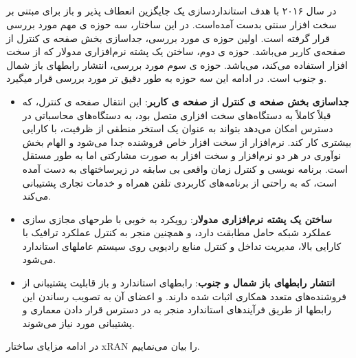 \subsection{}
در سال ۲۰۱۶ با هدف استانداردسازی یک جایگزین انعطاف پذیر و باز برای 
مبتنی بر سخت افزار سنتی بدست آمده‌است.
 در این ساختار، سه حوزه ی مهم مورد بررسی قرار گرفته است.
اولین حوزه ی مورد بررسی، جداسازی بخش
صفحه ی کنترل
  از 
 صفحه‌ی کاربر
می‌باشد. حوزه ی دوم،
ساختن یک پشته نرم‌افزاری  مدولار که از سخت افزار  استفاده می‌کند، می‌باشد.
حوزه ی سوم مورد بررسی، انتشار رابطهای باز شمال و جنوب است\cite{xran}.
در ادامه این سه حوزه به طور دقیق تر مورد بررسی قرار میگیرد\cite{xran1}.

\begin{itemize}
\item \textbf{ جداسازی بخش صفحه ی کنترل از 
صفحه ی کاربر}:
این انتقال صفحه ی کنترل، که قبلاً کاملاً به دستگاه‌های سخت افزاری  متصل بود، به دستگاه‌های محاسباتی در دسترس امکان می‌دهد  بتواند به عنوان یک استخر منطقی از ظرفیت، با کارایی بیشتری کار کند.
نرم‌افزار  از سخت افزار خاص فروشنده جدا می‌شود و الهام بخش نوآوری در هر دو نرم‌افزار و سخت افزار به صورت مشارکتی اما به طور مستقل است.
برنامه نویسی و کنترل زمان واقعی بی سابقه در زیرساختهای  به دست آمده است، که به راحتی از برنامه‌های کاربردی تلفن همراه و خدمات تجاری پشتیبانی می‌کند.
\item \textbf{ساختن یک پشته نرم‌افزاری  مدولار}:
رویکرد  به خوبی با طرحهای مجازی سازی عملکرد شبکه حامل  مطابقت دارد، و همچنین منجر به کنترل عملکرد ترافیک با کارایی بالا، مدیریت تداخل و کنترل منابع رادیویی روی سیستم عاملهای استاندارد  می‌شود.
\item \textbf{انتشار رابطهای باز شمال و جنوب}: 
رابطهای استاندارد و باز قابلیت پشتیبانی از فروشنده‌های متعدد همکاری اثبات شده دارند. 
و اعضای آن به تصویب رساندن این رابطها از طریق فرآیندهای استاندارد منجر به در دسترس قرار دادن معماری  و پشتیبانی مورد نیاز می‌شوند.

\end{itemize}
در ادامه مزایای ساختار xRAN را بیان می‌نماییم.

